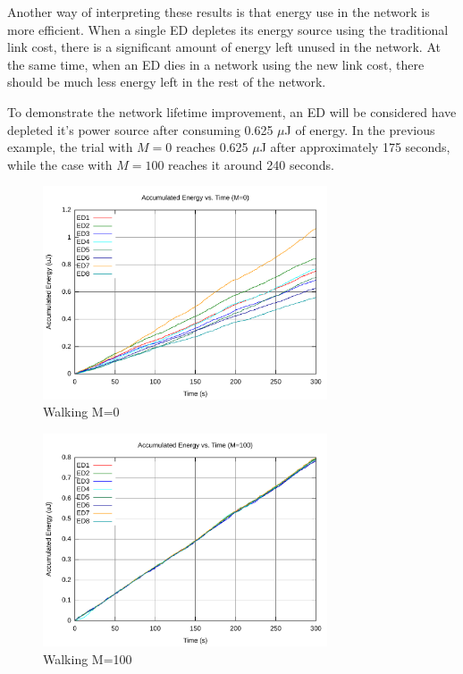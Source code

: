 \documentclass{article}
\begin{document}
Another way of interpreting these results is that energy use in the network is more efficient. When a single ED depletes its energy source using the traditional link cost, there is a significant amount of energy left unused in the network. At the same time, when an ED dies in a network using the new link cost, there should be much less energy left in the rest of the network.

To demonstrate the network lifetime improvement, an ED will be considered have depleted it's power source after consuming 0.625 $\mu$J of energy. In the previous example, the trial with $M=0$ reaches 0.625 $\mu$J after approximately 175 seconds, while the case with $M=100$ reaches it around 240 seconds.

\begin{figure}[!htb]
\begin{center}
\includegraphics[width=0.75\textwidth]{figures/walk2-c0.pdf}
\caption{Walking M=0}
\label{fig:walk2-c0}
\end{center}
\end{figure}

\begin{figure}[!htb]
\begin{center}
\includegraphics[width=0.75\textwidth]{figures/walk2-c100.pdf}
\caption{Walking M=100}
\label{fig:walk2-c100}
\end{center}
\end{figure}
\end{document}

